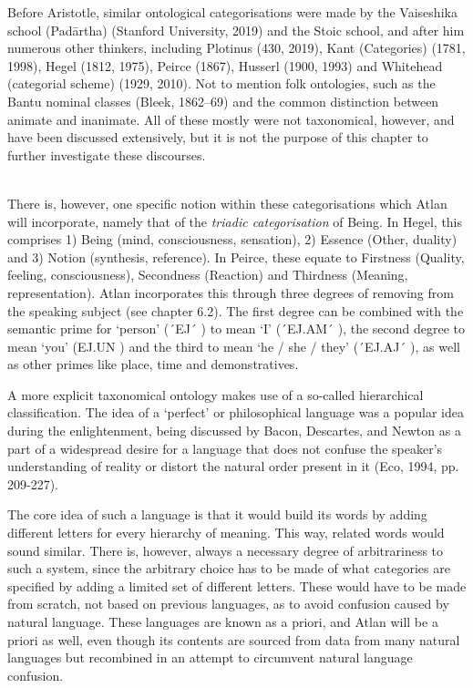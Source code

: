 Before Aristotle, similar ontological categorisations were made by the Vaiseshika school (Padārtha) (Stanford University, 2019) and the Stoic school, and after him numerous other thinkers, including Plotinus (430, 2019), Kant (Categories) (1781, 1998), Hegel  (1812, 1975), Peirce (1867), Husserl (1900, 1993) and Whitehead (categorial scheme) (1929, 2010). Not to mention folk ontologies, such as the Bantu nominal classes (Bleek, 1862–69) and the common distinction between animate and inanimate. All of these mostly were not taxonomical, however, and have been discussed extensively, but it is not the purpose of this chapter to further investigate these discourses.  

\phantom{.}\\

There is, however, one specific notion within these categorisations which Atlan will incorporate, namely that of the {\it triadic categorisation} of Being. In Hegel, this comprises 1) Being (mind, consciousness, sensation), 2) Essence (Other, duality) and 3) Notion (synthesis, reference). In Peirce, these equate to Firstness (Quality, feeling, consciousness), Secondness (Reaction) and Thirdness (Meaning, representation). Atlan incorporates this through three degrees of removing from the speaking subject (see chapter 6.2). The first degree can be combined with the semantic prime for ‘person’ (´EJ´ \ej) to mean ‘I’ (´EJ.AM´ \ej \am), the second degree to mean ‘you’ (EJ.UN \ej \un) and the third to mean ‘he / she / they’ (´EJ.AJ´ \ej \aj), as well as other primes like place, time and demonstratives. 

\vspace{-0.1cm}
A more explicit taxonomical ontology makes use of a so-called hierarchical classification. The idea of a ‘perfect’ or philosophical language was a popular idea during the enlightenment, being discussed by Bacon, Descartes, and Newton as a part of a widespread desire for a language that does not confuse the speaker’s understanding of reality or distort the natural order present in it (Eco, 1994, pp. 209-227). 

The core idea of such a language is that it would build its words by adding different letters for every hierarchy of meaning. This way, related words would sound similar. There is, however, always a necessary degree of arbitrariness to such a system, since the arbitrary choice has to be made of what categories are specified by adding a limited set of different letters. These would have to be made from scratch, not based on previous languages, as to avoid confusion caused by natural language. These languages are known as a priori, and Atlan will be a priori as well, even though its contents are sourced from data from many natural languages but recombined in an attempt to circumvent natural language confusion.  

